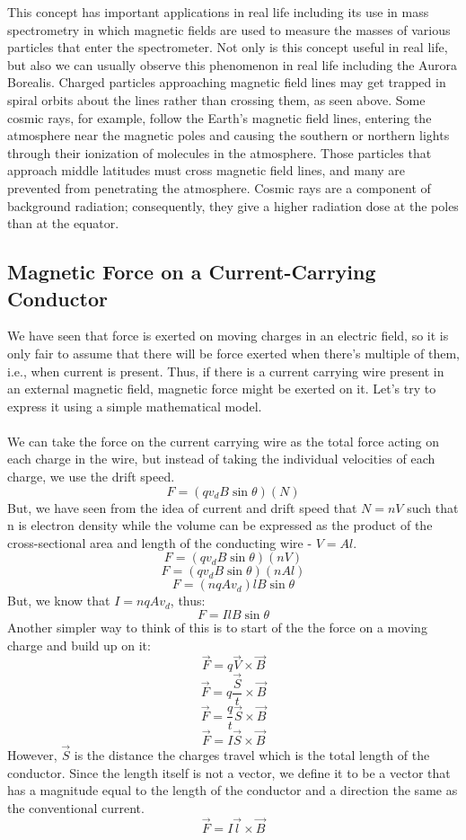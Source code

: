 \documentclass[9pt]{article}
\begin{document}
 	 This concept has important applications in real life including its use in mass spectrometry in which magnetic fields are used to measure the masses of various particles that enter the spectrometer. Not only is this concept useful in real life, but also we can usually observe this phenomenon in real life including the Aurora Borealis.  Charged particles approaching magnetic field lines may get trapped in spiral orbits about the lines rather than crossing them, as seen above. Some cosmic rays, for example, follow the Earth’s magnetic field lines, entering the atmosphere near the magnetic poles and causing the southern or northern lights through their ionization of molecules in the atmosphere. Those particles that approach middle latitudes must cross magnetic field lines, and many are prevented from penetrating the atmosphere. Cosmic rays are a component of background radiation; consequently, they give a higher radiation dose at the poles than at the equator.
 	 \subsection*{Magnetic Force on a Current-Carrying Conductor}
 	 We have seen that force is exerted on moving charges in an electric field, so it is only fair to assume that there will be force exerted when there's multiple of them, i.e., when current is present. Thus, if there is a current carrying wire present in an external magnetic field, magnetic force might be exerted on it. Let's try to express it using a simple mathematical model. \\ \\
 	 We can take the force on the current carrying wire as the total force acting on each charge in the wire, but instead of taking the individual velocities of each charge, we use the drift speed.
 	 $$F = \left(qv_{d}B \sin \theta \right) \left(N\right)$$
 	 But, we have seen from the idea of current and drift speed that $N=nV$ such that n is electron density while the volume can be expressed as the product of the cross-sectional area and length of the conducting wire - $V=Al$.
 	 $$F = \left(qv_{d}B \sin \theta \right) \left(nV\right)$$
 	 $$F = \left(qv_{d}B \sin \theta \right) \left(nAl\right)$$
 	 $$F = \left(nqAv_{d}\right)lB\sin\theta$$
 	 But, we know that $I=nqAv_{d}$, thus:
 	 $$F = IlB\sin\theta$$
 	 Another simpler way to think of this is to start of the the force on a moving charge and build up on it:
 	 $$\vec{F}=q\vec{V}\times\vec{B}$$
 	 $$\vec{F}=q\dfrac{\vec{S}}{t}\times\vec{B}$$
 	 $$\vec{F}=\dfrac{q}{t}\vec{S}\times\vec{B}$$
 	 $$\vec{F}=I\vec{S}\times\vec{B}$$
 	 However, $\vec{S}$ is the distance the charges travel which is the total length of the conductor. Since the length itself is not a vector, we define it to be a vector that has a magnitude equal to the length of the conductor and a direction the same as the conventional current.
 	 $$\vec{F}=I\vec{l}\times\vec{B}$$
\end{document}
